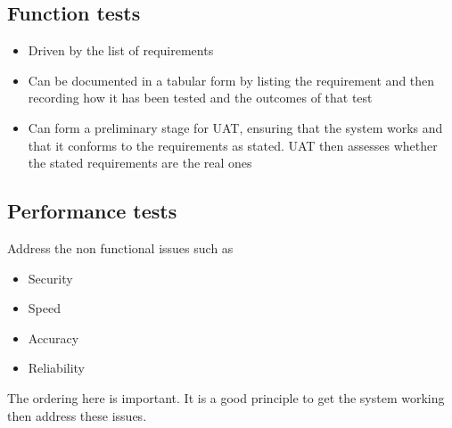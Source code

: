 \documentclass{article}[18pt]
\begin{document}
\subsection{Function tests}
\begin{itemize}
	\item Driven by the list of requirements
	\item Can be documented in a tabular form by listing the requirement and then recording how it has been tested and the outcomes of that test
	\item Can form a preliminary stage for UAT, ensuring that the system works and that it conforms to the requirements as stated. UAT then assesses whether the stated requirements are the real ones
\end{itemize}
\subsection{Performance tests}
Address the non functional issues such as
\begin{itemize}
	\item Security
	\item Speed
	\item Accuracy
	\item Reliability
\end{itemize}
The ordering here is important. It is a good principle to get the system working then address these issues.
\end{document}
